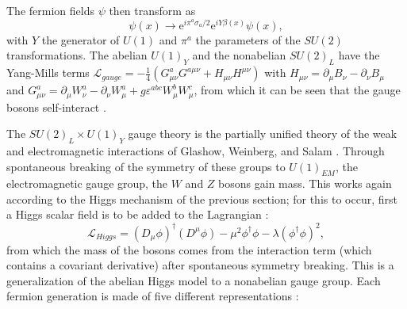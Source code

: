 The fermion fields $\psi$ then transform as 
\begin{equation}
\psi(x) \to \mathrm{e}^{i\pi^a\sigma_a/2}\mathrm{e}^{iY\beta(x)}\psi(x),
\label{eqn:phitransformsagain}
\end{equation}
with $Y$ the generator of $U(1)$ and $\pi^a$ the parameters of the $SU(2)$ transformations. The abelian $U(1)_Y$ and the nonabelian $SU(2)_L$ have the Yang-Mills terms $\mathcal{L}_{gauge} = -\frac{1}{4}(G^a_{\mu\nu}G^{a\mu\nu} + H_{\mu\nu}H^{\mu\nu})$ with $H_{\mu\nu} = \partial_\mu B_{\nu} -\partial_\nu B_\mu$ and $G^a_{\mu\nu}= \partial_\mu W^a_\nu -\partial_\nu W^a_\mu + g\varepsilon^{abc}W^b_\mu W^c_\mu$, from which it can be seen that the gauge bosons self-interact \cite{roubillard2005th}.

The $SU(2)_L \times U(1)_Y$ gauge theory is the partially unified theory of the weak and electromagnetic interactions of Glashow, Weinberg, and Salam \cite{peskin1995introduction}. Through spontaneous breaking of the symmetry of these groups to $U(1)_{EM}$, the electromagnetic gauge group, the $W$ and $Z$ bosons gain mass. This works again according to the Higgs mechanism of the previous section; for this to occur, first a Higgs scalar field is to be added to the Lagrangian \cite{quigg1983gauge}:
\begin{equation}
\mathcal L_{Higgs} = (D_\mu\phi)^\dag(D^\mu\phi) - \mu^2\phi^\dag\phi - \lambda(\phi^\dag\phi)^2,
\label{eqn:SMLHiggs}
\end{equation}
from which the mass of the bosons comes from the interaction term (which contains a covariant derivative) after spontaneous symmetry breaking. This is a generalization of the abelian Higgs model to a nonabelian gauge group. Each fermion generation is made of five different representations \cite{peskin1995introduction}:

